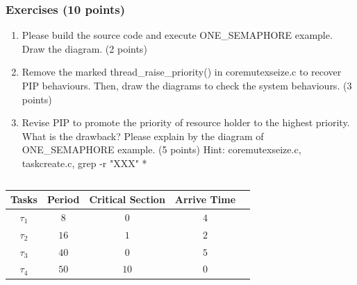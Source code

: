 \documentclass[t]{beamer}
\begin{document}
\begin{frame}
\frametitle{Exercises (10 points)}
\begin{enumerate}
\item Please build the source code and execute ONE\_SEMAPHORE example. Draw the diagram. (2 points) 
\item Remove the marked thread\_raise\_priority() in coremutexseize.c to recover PIP behaviours. Then, draw the diagrams to check the system behaviours. (3 points) 
\item Revise PIP to promote the priority of resource holder to the highest priority. What is the drawback? Please explain by the diagram of ONE\_SEMAPHORE example. (5 points)
\newline Hint: coremutexseize.c, taskcreate.c, grep -r "XXX" *
\end{enumerate}
\begin{columns}
    \column{\textwidth}
  \begin{table}
    \centering
    \begin{tabular}{|c|c|c|c|c|}
      \hline
     Tasks & Period & Critical Section & Arrive Time\\
     \hline
     $\tau_1$ & $8$ & $0$ & $4$ \\
     \hline
     $\tau_2$ & $16$ & $1$ & $2$ \\
     \hline
     $\tau_3$ & $40$ & $0$ & $5$ \\
     \hline
     $\tau_4$ & $50$ & $10$ & $0$ \\
     \hline
    \end{tabular}
  \end{table}
  \end{columns}

\end{frame}
\end{document}
